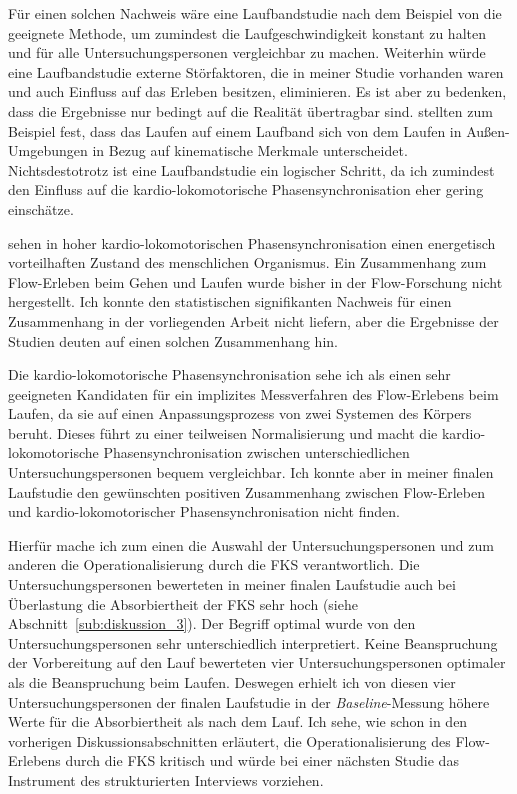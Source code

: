 Für einen solchen Nachweis wäre eine Laufbandstudie nach dem Beispiel von \citet{Reinhardt2006} die geeignete Methode, um zumindest die Laufgeschwindigkeit konstant zu halten und für alle Untersuchungspersonen vergleichbar zu machen. Weiterhin würde eine Laufbandstudie externe Störfaktoren, die in meiner Studie vorhanden waren und auch Einfluss auf das Erleben besitzen, eliminieren. Es ist aber zu bedenken, dass die Ergebnisse nur bedingt auf die Realität übertragbar sind. \citet{Strohrmann2012} stellten zum Beispiel fest, dass das Laufen auf einem Laufband sich von dem Laufen in Außen-Umgebungen in Bezug auf kinematische Merkmale unterscheidet. Nichtsdestotrotz ist eine Laufbandstudie ein logischer Schritt, da ich zumindest den Einfluss auf die kardio-lokomotorische Phasensynchronisation eher gering einschätze. 

\citet[][S.~18]{Niizeki2014} sehen in hoher kardio-lokomotorischen Phasensynchronisation einen energetisch vorteilhaften Zustand des menschlichen Organismus. Ein Zusammenhang zum Flow-Erleben beim Gehen und Laufen wurde bisher in der Flow-Forschung nicht hergestellt. Ich konnte den statistischen signifikanten Nachweis für einen Zusammenhang in der vorliegenden Arbeit nicht liefern, aber die Ergebnisse der Studien deuten auf einen solchen Zusammenhang hin. 
 
Die kardio-lokomotorische Phasensynchronisation sehe ich als einen sehr geeigneten Kandidaten für ein implizites Messverfahren des Flow-Erlebens beim Laufen, da sie auf einen Anpassungsprozess von zwei Systemen des Körpers beruht. Dieses führt zu einer teilweisen Normalisierung und macht die kardio-lokomotorische Phasensynchronisation zwischen unterschiedlichen Untersuchungspersonen bequem vergleichbar. Ich konnte aber in meiner finalen Laufstudie den gewünschten positiven Zusammenhang zwischen Flow-Erleben und kardio-lokomotorischer Phasensynchronisation nicht finden. 

Hierfür mache ich zum einen die Auswahl der Untersuchungspersonen und zum anderen die Operationalisierung durch die \ac{FKS} verantwortlich. Die Untersuchungspersonen bewerteten in meiner finalen Laufstudie auch bei Überlastung die Absorbiertheit der \ac{FKS} sehr hoch (siehe Abschnitt~\ref{sub:diskussion_3}). Der Begriff optimal wurde von den Untersuchungspersonen sehr unterschiedlich interpretiert. Keine Beanspruchung der Vorbereitung auf den Lauf bewerteten vier Untersuchungspersonen optimaler als die Beanspruchung beim Laufen. Deswegen erhielt ich von diesen vier Untersuchungspersonen der finalen Laufstudie in der \emph{Baseline}-Messung höhere Werte für die Absorbiertheit als nach dem Lauf. Ich sehe, wie schon in den vorherigen Diskussionsabschnitten erläutert, die Operationalisierung des Flow-Erlebens durch die \ac{FKS} kritisch und würde bei einer nächsten Studie das Instrument des strukturierten Interviews vorziehen.

